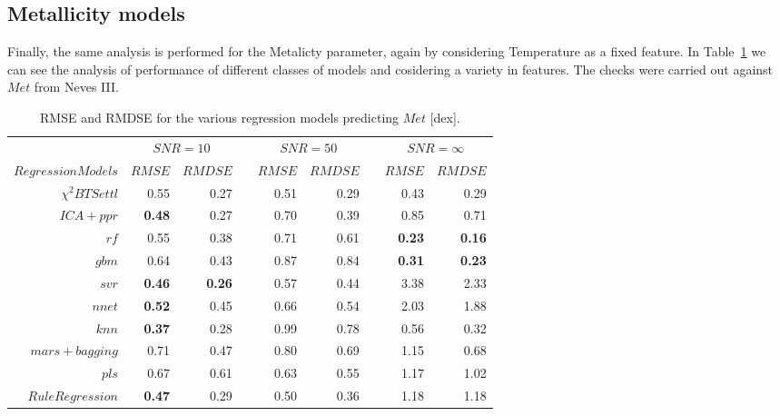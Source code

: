 \subsection{Metallicity models} 

Finally, the same analysis is performed for the Metalicty parameter, 
again by considering Temperature as a fixed feature.
In Table~\ref{tab:models_M_rmse} 
we can see the analysis of performance of different classes of
models and cosidering a variety in features. The checks were carried out against 
$Met$ from Neves III.

%
%
\begin{table}\centering
\begin{tabular}{@{}rrrcrrcrr@{}}\toprule
& \multicolumn{2}{c}{$SNR = 10$} & \phantom{ab}& \multicolumn{2}{c}{$SNR = 50$} &
\phantom{ab} & \multicolumn{2}{c}{$SNR = \infty$}\\
\cmidrule{2-3} \cmidrule{5-6} \cmidrule{8-9}
$Regression Models$ & $RMSE$ & $RMDSE$ && $RMSE$ & $RMDSE$     && $RMSE$       & $RMDSE$ \\ \midrule
$\chi^2 BTSettl$    &  0.55    & 0.27   && 0.51 & 0.29 && 0.43  & 0.29 \\
$ ICA+ ppr$         & \bf{0.48} & 0.27 && 0.70  & 0.39 && 0.85  & 0.71 \\
$rf $               & 0.55 & 0.38    && 0.71  & 0.61   && \bf{0.23}  & \bf{0.16} \\
$gbm $              & 0.64 & 0.43 && 0.87  & 0.84  && \bf{0.31}  & \bf{0.23} \\
$ svr $             & \bf{0.46} & \bf{0.26}   && 0.57 & 0.44  && 3.38  & 2.33 \\
$ nnet $            & \bf{0.52} & 0.45      && 0.66 & 0.54  && 2.03  & 1.88 \\
$ knn $             & \bf{0.37}  & 0.28   && 0.99  & 0.78 && 0.56 & 0.32 \\ 
$ mars+ bagging $   & 0.71  & 0.47 && 0.80   & 0.69   && 1.15    & 0.68 \\
$ pls $             & 0.67  & 0.61  && 0.63  & 0.55 && 1.17 & 1.02 \\ 
$Rule Regression $  & \bf{0.47} & 0.29 && 0.50 & 0.36  && 1.18 &  1.18 \\

\bottomrule
\end{tabular}
\caption {RMSE and RMDSE for the various regression models predicting $Met$ [dex].} 
\label{tab:models_M_rmse} 
\end{table}



